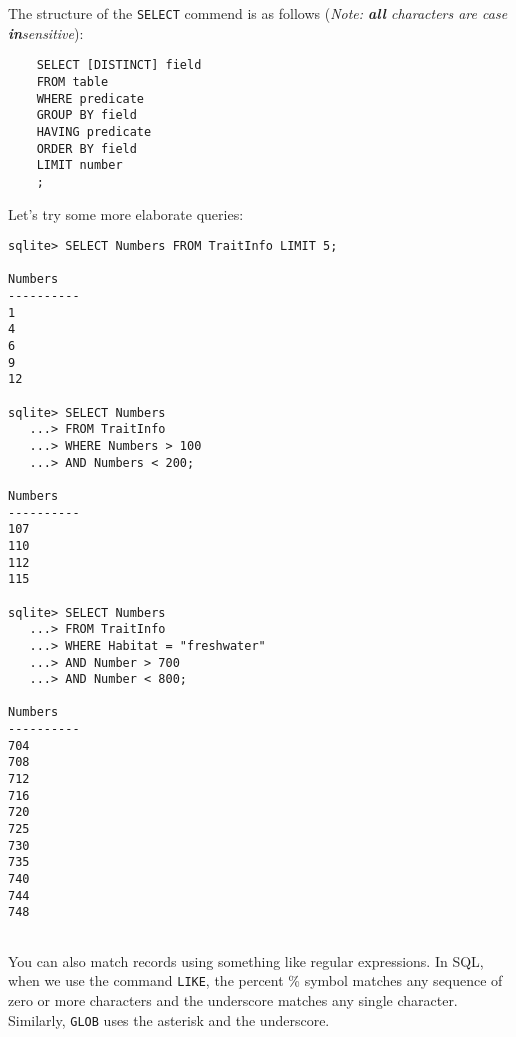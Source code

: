 The structure of the {\tt SELECT} commend is as follows ({\it Note: 
{\bf all} characters are case {\bf in}sensitive}):
\begin{verbatim}
	SELECT [DISTINCT] field
	FROM table
	WHERE predicate
	GROUP BY field
	HAVING predicate
	ORDER BY field
	LIMIT number
	;
\end{verbatim}

Let's try some more elaborate queries:

\begin{lstlisting} 
sqlite> SELECT Numbers FROM TraitInfo LIMIT 5;

Numbers   
----------
1         
4         
6         
9         
12      

sqlite> SELECT Numbers 
   ...> FROM TraitInfo
   ...> WHERE Numbers > 100 
   ...> AND Numbers < 200;

Numbers   
----------
107       
110       
112       
115         

sqlite> SELECT Numbers 
   ...> FROM TraitInfo
   ...> WHERE Habitat = "freshwater"
   ...> AND Number > 700
   ...> AND Number < 800;

Numbers   
----------
704       
708       
712       
716       
720       
725       
730       
735       
740       
744       
748       
      
\end{lstlisting}

You can also match records using something like regular expressions. In 
SQL, when we use the command {\tt LIKE}, the percent \% symbol matches 
any sequence of zero or more characters and the underscore matches any 
single character. Similarly, {\tt GLOB} uses the asterisk and the 
underscore.

